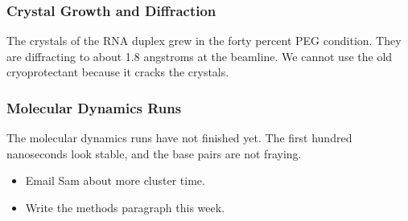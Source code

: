 \subsubsection{Crystal Growth and Diffraction}

The crystals of the RNA duplex grew in the forty percent PEG condition.
They are diffracting to about 1.8 angstroms at the beamline.
We cannot use the old cryoprotectant because it cracks the crystals.

\subsubsection{Molecular Dynamics Runs}

The molecular dynamics runs have not finished yet.
The first hundred nanoseconds look stable, and the base pairs are not fraying.

\begin{itemize}[label=\unchecked]
\item Email Sam about more cluster time.
\item Write the methods paragraph this week.
\end{itemize}
